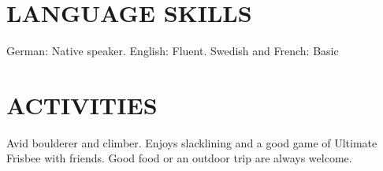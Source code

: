 \documentclass[10pt,centered]{./res} %
\begin{document}
\begin{resume}
\begin{enumerate}
\end{enumerate}

\section{\color{ResumeBlue}LANGUAGE SKILLS}
\vspace*{0.2cm}
German: Native speaker. English: Fluent. Swedish and French: Basic

\section{\color{ResumeBlue}ACTIVITIES}
\vspace*{0.2cm}
Avid boulderer and climber. Enjoys slacklining and a good game of Ultimate Frisbee with friends. Good food or an outdoor trip are always welcome.

\end{resume}
\end{document}
